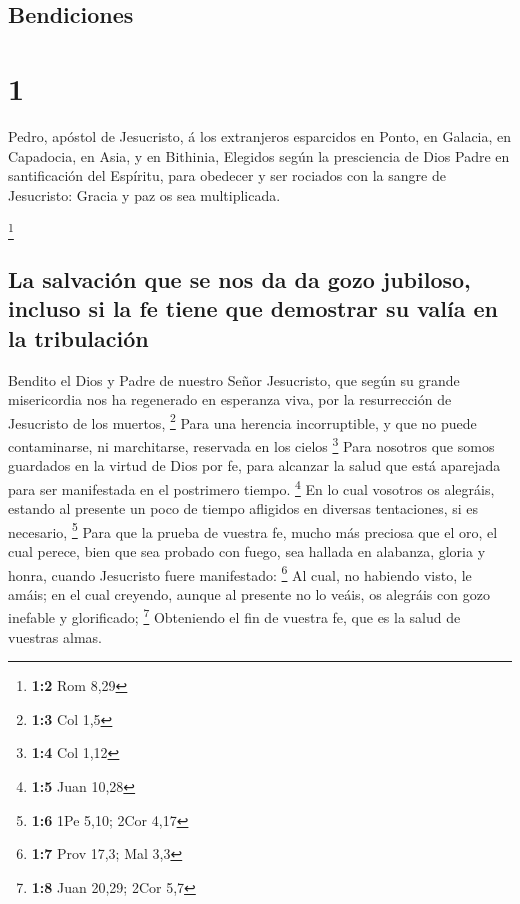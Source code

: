 \hypertarget{bendiciones}{%
\subsection{Bendiciones}\label{bendiciones}}

\hypertarget{section}{%
\section{1}\label{section}}

 Pedro, apóstol de Jesucristo, á los extranjeros
esparcidos en Ponto, en Galacia, en Capadocia, en Asia, y en Bithinia,
 Elegidos según la presciencia de Dios Padre en
santificación del Espíritu, para obedecer y ser rociados con la sangre
de Jesucristo: Gracia y paz os sea multiplicada.

\footnote{\textbf{1:2} Rom 8,29}

\hypertarget{la-salvaciuxf3n-que-se-nos-da-da-gozo-jubiloso-incluso-si-la-fe-tiene-que-demostrar-su-valuxeda-en-la-tribulaciuxf3n}{%
\subsection{La salvación que se nos da da gozo jubiloso, incluso si la
fe tiene que demostrar su valía en la
tribulación}\label{la-salvaciuxf3n-que-se-nos-da-da-gozo-jubiloso-incluso-si-la-fe-tiene-que-demostrar-su-valuxeda-en-la-tribulaciuxf3n}}

 Bendito el Dios y Padre de nuestro Señor Jesucristo, que
según su grande misericordia nos ha regenerado en esperanza viva, por la
resurrección de Jesucristo de los muertos, \footnote{\textbf{1:3} Col
  1,5}  Para una herencia incorruptible, y que no puede
contaminarse, ni marchitarse, reservada en los cielos \footnote{\textbf{1:4}
  Col 1,12}  Para nosotros que somos guardados en la
virtud de Dios por fe, para alcanzar la salud que está aparejada para
ser manifestada en el postrimero tiempo. \footnote{\textbf{1:5} Juan
  10,28}  En lo cual vosotros os alegráis, estando al
presente un poco de tiempo afligidos en diversas tentaciones, si es
necesario, \footnote{\textbf{1:6} 1Pe 5,10; 2Cor 4,17} 
Para que la prueba de vuestra fe, mucho más preciosa que el oro, el cual
perece, bien que sea probado con fuego, sea hallada en alabanza, gloria
y honra, cuando Jesucristo fuere manifestado: \footnote{\textbf{1:7}
  Prov 17,3; Mal 3,3}  Al cual, no habiendo visto, le
amáis; en el cual creyendo, aunque al presente no lo veáis, os alegráis
con gozo inefable y glorificado; \footnote{\textbf{1:8} Juan 20,29; 2Cor
  5,7}  Obteniendo el fin de vuestra fe, que es la salud
de vuestras almas.


